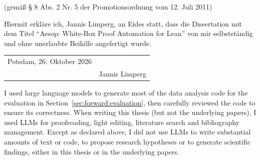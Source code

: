 
\noindent (gemäß § 8 Abs. 2 Nr. 5 der Promotionsordnung vom 12. Juli 2011)

\medskip

\noindent Hiermit erkläre ich, Jannis Limperg, an Eides statt, dass die Dissertation mit dem Titel \enquote{Aesop: White-Box Proof Automation for Lean} von mir selbstständig und ohne unerlaubte Beihilfe angefertigt wurde.

\vspace{25mm}

\begin{tabular}{@{}p{2.5in}p{2in}@{}}
Potsdam, 26. Oktober 2026 & \hrulefill \\
                          & Jannis Limperg \\
\end{tabular}


I used large language models to generate most of the data analysis code for the evaluation in Section~\ref{sec:forward:evaluation}, then carefully reviewed the code to ensure its correctness.
When writing this thesis (but not the underlying papers), I used LLMs for proofreading, light editing, literature search and bibliography management.
Except as declared above, I did not use LLMs to write substantial amounts of text or code, to propose research hypotheses or to generate scientific findings, either in this thesis or in the underlying papers.
